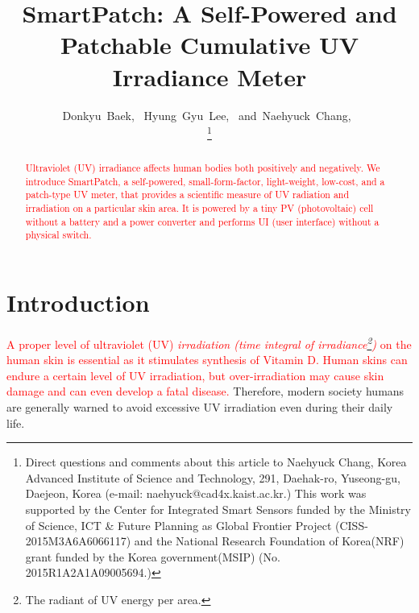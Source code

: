 \documentclass[journal]{IEEEtran}
\begin{document}
\title{SmartPatch: A Self-Powered and Patchable Cumulative UV Irradiance Meter}

\author{
	Donkyu~Baek,~
	Hyung~Gyu~Lee,~
	and~Naehyuck~Chang,~

\thanks{Direct questions and comments about this article to Naehyuck Chang, Korea Advanced Institute of Science and Technology, 291, Daehak-ro, Yuseong-gu, Daejeon, Korea (e-mail: naehyuck@cad4x.kaist.ac.kr.) This work was supported by the Center for Integrated Smart Sensors funded by the Ministry of Science, ICT \& Future Planning as Global Frontier Project (CISS-2015M3A6A6066117) and the National Research Foundation of Korea(NRF) grant funded by the Korea government(MSIP) (No. 2015R1A2A1A09005694.)}
}

\maketitle

\begin{abstract}
\textcolor{red}{Ultraviolet (UV) irradiance affects human bodies both positively and negatively. We introduce SmartPatch, a self-powered, small-form-factor, light-weight, low-cost, and a patch-type UV meter, that provides a scientific measure of UV radiation and irradiation on a particular skin area. It is powered by a tiny PV (photovoltaic) cell without a battery and a power converter and performs UI (user interface) without a physical switch.} 
\end{abstract}



\section{Introduction}

\textcolor{red}{A proper level of ultraviolet (UV) \textit{irradiation (time integral of irradiance\footnote{The radiant of UV energy per area.})} on the human skin is essential as it stimulates synthesis of Vitamin D. Human skins can endure a certain level of UV irradiation, but over-irradiation may cause skin damage and can even develop a fatal disease.}
Therefore, modern society humans are generally warned to avoid excessive UV irradiation even during their daily life.
\end{document}
